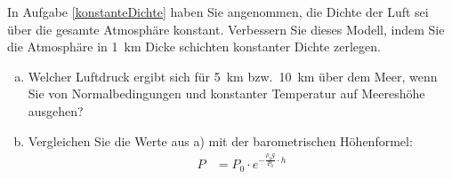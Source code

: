 \begin{aufgabe}
	In Aufgabe \ref{konstanteDichte} haben Sie angenommen, die Dichte der Luft sei über die gesamte Atmosphäre konstant.
	Verbessern Sie dieses Modell, indem Sie die Atmosphäre in \SI{1}{km} Dicke schichten konstanter Dichte zerlegen.
	\begin{enumerate}[a)]
		\item Welcher Luftdruck ergibt sich für \SI{5}{km} bzw.~\SI{10}{km} über dem Meer, wenn Sie von Normalbedingungen
			und konstanter Temperatur auf Meereshöhe ausgehen? 
		\item Vergleichen Sie die Werte aus a) mit der barometrischen Höhenformel:
			\begin{eqnarray*}
				P&=P_0\cdot e^{-\frac{\rho_0 g}{P_0}\cdot h}
			\end{eqnarray*}
	\end{enumerate}
	
\end{aufgabe}



